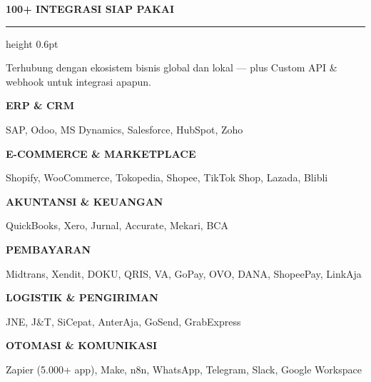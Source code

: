 \documentclass[a4paper]{article}
\newcommand{\sectiontitle}[1]{%
    \vspace{10pt}%
    {\fontsize{13}{16}\selectfont\bfseries\color{BlueDark} #1}\par\vspace{3pt}%
    {\color{BluePrimary}\hrule height 0.6pt}\par\vspace{8pt}%
}
\begin{document}
\sectiontitle{100+ INTEGRASI SIAP PAKAI}

{\fontsize{8.5}{11}\selectfont\color{TextDark}Terhubung dengan ekosistem bisnis global dan lokal --- plus Custom API \& webhook untuk integrasi apapun.}

\vspace{4pt}

\noindent
\begin{minipage}[t]{0.485\textwidth}
    {\fontsize{9}{11}\selectfont\bfseries\color{BluePrimary} ERP \& CRM}\par\vspace{1pt}
    {\fontsize{8.5}{11}\selectfont\color{TextDark}SAP, Odoo, MS Dynamics, Salesforce, HubSpot, Zoho}\par\vspace{3pt}
    {\fontsize{9}{11}\selectfont\bfseries\color{BluePrimary} E-COMMERCE \& MARKETPLACE}\par\vspace{1pt}
    {\fontsize{8.5}{11}\selectfont\color{TextDark}Shopify, WooCommerce, Tokopedia, Shopee, TikTok Shop, Lazada, Blibli}\par\vspace{3pt}
    {\fontsize{9}{11}\selectfont\bfseries\color{BluePrimary} AKUNTANSI \& KEUANGAN}\par\vspace{1pt}
    {\fontsize{8.5}{11}\selectfont\color{TextDark}QuickBooks, Xero, Jurnal, Accurate, Mekari, BCA}%
\end{minipage}%
\hfill
\begin{minipage}[t]{0.485\textwidth}
    {\fontsize{9}{11}\selectfont\bfseries\color{BluePrimary} PEMBAYARAN}\par\vspace{1pt}
    {\fontsize{8.5}{11}\selectfont\color{TextDark}Midtrans, Xendit, DOKU, QRIS, VA, GoPay, OVO, DANA, ShopeePay, LinkAja}\par\vspace{3pt}
    {\fontsize{9}{11}\selectfont\bfseries\color{BluePrimary} LOGISTIK \& PENGIRIMAN}\par\vspace{1pt}
    {\fontsize{8.5}{11}\selectfont\color{TextDark}JNE, J\&T, SiCepat, AnterAja, GoSend, GrabExpress}\par\vspace{3pt}
    {\fontsize{9}{11}\selectfont\bfseries\color{BluePrimary} OTOMASI \& KOMUNIKASI}\par\vspace{1pt}
    {\fontsize{8.5}{11}\selectfont\color{TextDark}Zapier (5.000+ app), Make, n8n, WhatsApp, Telegram, Slack, Google Workspace}%
\end{minipage}
\end{document}
